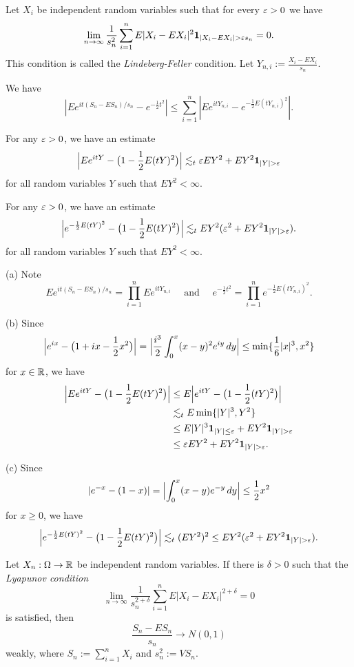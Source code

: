 \documentclass{../../large}
\begin{document}
\begin{prb}
Let $X_i$ be independent random variables such that for every $\varepsilon>0$ we have
\[\lim_{n\to\infty}\frac1{s_n^2}\sum_{i=1}^nE|X_i-EX_i|^2\1_{|X_i-EX_i|>\e s_n}=0.\]
This condition is called the \emph{Lindeberg-Feller} condition.
Let $Y_{n,i}:=\frac{X_i-EX_i}{s_n}$.
\begin{parts}
\item We have
\[|Ee^{it(S_n-ES_n)/s_n}-e^{-\frac12t^2}|\le\sum_{i=1}^n|Ee^{itY_{n,i}}-e^{-\frac12E(tY_{n,i})^2}|.\]
\item For any $\varepsilon>0$, we have an estimate
\[\Bigl|Ee^{itY}-\bigl(1-\frac12E(tY)^2\bigr)\Bigr|\lesssim_t\e EY^2+EY^2\1_{|Y|>\e}\]
for all random variables $Y$ such that $EY^2<\infty$.
\item For any $\varepsilon>0$, we have an estimate
\[\Bigl|e^{-\frac12E(tY)^2}-\bigl(1-\frac12E(tY)^2\bigr)\Bigr|
\lesssim_tEY^2(\e^2+EY^2\1_{|Y|>\e}).\]
for all random variables $Y$ such that $EY^2<\infty$.
\item
\end{parts}
\end{prb}
\begin{pf}
(a)
Note
\[Ee^{it(S_n-ES_n)/s_n}=\prod_{i=1}^nEe^{itY_{n,i}}\quad\text{ and }\quad e^{-\frac12t^2}=\prod_{i=1}^ne^{-\frac12E(tY_{n,i})^2}.\]

(b)
Since
\[\Bigl|e^{ix}-\bigl(1+ix-\frac12x^2\bigr)\Bigr|=\Bigl|\frac{i^3}2\int_0^x(x-y)^2e^{iy}\,dy\Bigr|\le\min\{\frac16|x|^3,x^2\}\]
for $x\in\mathbb{R}$, we have
\begin{align*}
\Bigl|Ee^{itY}-\bigl(1-\frac12E(tY)^2\bigr)\Bigr|
&\le E\Bigl|e^{itY}-\bigl(1-\frac12(tY)^2\bigr)\Bigr|\\
&\lesssim_t E\min\{|Y|^3,Y^2\}\\
&\le E|Y|^3\1_{|Y|\le\e}+EY^2\1_{|Y|>\e}\\
&\le\e EY^2+EY^2\1_{|Y|>\e}.
\end{align*}

(c)
Since
\[|e^{-x}-(1-x)|=\Bigl|\int_0^x(x-y)e^{-y}\,dy\Bigr|\le\frac12x^2\]
for $x\ge0$, we have
\[\Bigl|e^{-\frac12E(tY)^2}-\bigl(1-\frac12E(tY)^2\bigr)\Bigr|
\lesssim_t(EY^2)^2\le EY^2(\e^2+EY^2\1_{|Y|>\e}).\]
\end{pf}

\begin{prb}
Let $X_n:\Omega\to\mathbb{R}$ be independent random variables.
If there is $\delta>0$ such that the \emph{Lyapunov condition}
\[\lim_{n\to\infty}\frac1{s_n^{2+\delta}}\sum_{i=1}^nE|X_i-EX_i|^{2+\delta}=0\]
is satisfied, then
\[\frac{S_n-ES_n}{s_n}\to N(0,1)\]
weakly, where $S_n:=\sum_{i=1}^nX_i$ and $s_n^2:=VS_n$.
\end{prb}
\end{document}
